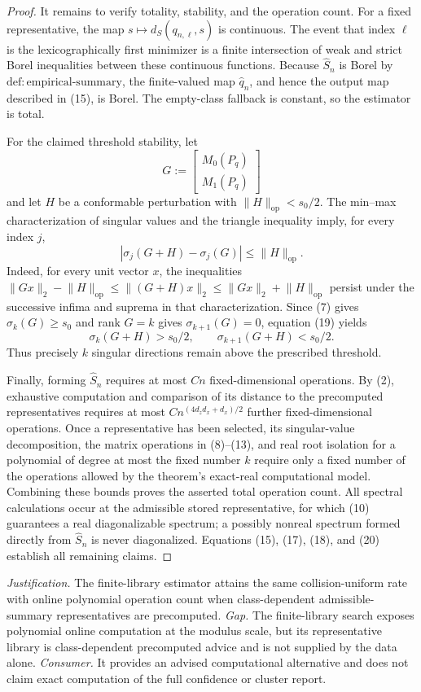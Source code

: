 \documentclass{article}
\begin{document}
\begin{proof}
It remains to verify totality, stability, and the operation count.  For a fixed representative, the map \(s\mapsto d_S(q_{n,\ell},s)\) is continuous.  The event that index \(\ell\) is the lexicographically first minimizer is a finite intersection of weak and strict Borel inequalities between these continuous functions.  Because \(\widehat S_n\) is Borel by \(\mathrm{def:empirical\text{-}summary}\), the finite-valued map \(\widehat q_n\), and hence the output map described in (15), is Borel.  The empty-class fallback is constant, so the estimator is total.

For the claimed threshold stability, let
\[
G:=\begin{bmatrix}M_0(P_q)\\M_1(P_q)\end{bmatrix}
\]
and let \(H\) be a conformable perturbation with \(\lVert H\rVert_{\mathrm{op}}<s_0/2\).  The min--max characterization of singular values and the triangle inequality imply, for every index \(j\),
\[
|\sigma_j(G+H)-\sigma_j(G)|\le\lVert H\rVert_{\mathrm{op}}. \tag{19}
\]
Indeed, for every unit vector \(x\), the inequalities \(\lVert Gx\rVert_2-\lVert H\rVert_{\mathrm{op}}\le\lVert(G+H)x\rVert_2\le\lVert Gx\rVert_2+\lVert H\rVert_{\mathrm{op}}\) persist under the successive infima and suprema in that characterization.  Since (7) gives \(\sigma_k(G)\ge s_0\) and rank \(G=k\) gives \(\sigma_{k+1}(G)=0\), equation (19) yields
\[
\sigma_k(G+H)>s_0/2,
\qquad
\sigma_{k+1}(G+H)<s_0/2. \tag{20}
\]
Thus precisely \(k\) singular directions remain above the prescribed threshold.

Finally, forming \(\widehat S_n\) requires at most \(Cn\) fixed-dimensional operations.  By (2), exhaustive computation and comparison of its distance to the precomputed representatives requires at most \(Cn^{(4d_zd_x+d_x)/2}\) further fixed-dimensional operations.  Once a representative has been selected, its singular-value decomposition, the matrix operations in (8)--(13), and real root isolation for a polynomial of degree at most the fixed number \(k\) require only a fixed number of the operations allowed by the theorem's exact-real computational model.  Combining these bounds proves the asserted total operation count.  All spectral calculations occur at the admissible stored representative, for which (10) guarantees a real diagonalizable spectrum; a possibly nonreal spectrum formed directly from \(\widehat S_n\) is never diagonalized.  Equations (15), (17), (18), and (20) establish all remaining claims.
\end{proof}
\par\smallskip\noindent \textit{Justification.} The finite-library estimator attains the same collision-uniform rate with online polynomial operation count when class-dependent admissible-summary representatives are precomputed. \textit{Gap.} The finite-library search exposes polynomial online computation at the modulus scale, but its representative library is class-dependent precomputed advice and is not supplied by the data alone. \textit{Consumer.} It provides an advised computational alternative and does not claim exact computation of the full confidence or cluster report.
\end{document}
